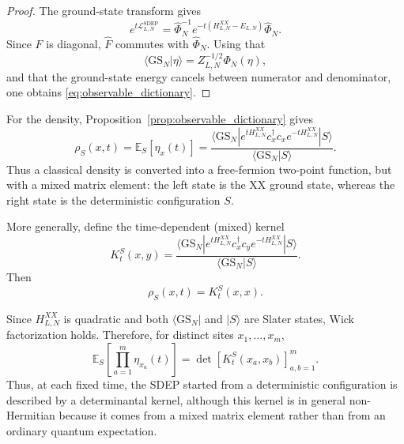 \documentclass[11pt]{article}
\numberwithin{equation}{section}
\newcommand{\1}{\mathbf 1}
\begin{document}
\begin{proof}
The ground-state transform gives
\[
    e^{t\mathcal L^{\mathrm{SDEP}}_{L,N}}
    =
    \widehat\Phi_N^{-1}
    e^{-t(H^{XX}_{L,N}-E_{L,N})}
    \widehat\Phi_N .
\]
Since \(F\) is diagonal, \(\widehat F\) commutes with \(\widehat\Phi_N\).  Using
that
\[
    \langle \mathrm{GS}_N|\eta\rangle
    =
    Z_{L,N}^{-1/2}\Phi_N(\eta),
\]
and that the ground-state energy cancels between numerator and denominator, one
obtains \eqref{eq:observable_dictionary}.
\end{proof}

For the density, Proposition~\ref{prop:observable_dictionary} gives
\begin{equation}
    \rho_S(x,t)
    =
    \mathbb E_S[\eta_x(t)]
    =
    \frac{
    \langle \mathrm{GS}_N|
    e^{tH^{XX}_{L,N}}
    c_x^\dagger c_x
    e^{-tH^{XX}_{L,N}}
    |S\rangle
    }{
    \langle \mathrm{GS}_N|S\rangle
    }.
    \label{eq:density_dictionary}
\end{equation}
Thus a classical density is converted into a free-fermion two-point function,
but with a mixed matrix element: the left state is the XX ground state, whereas
the right state is the deterministic configuration \(S\).

More generally, define the time-dependent (mixed) kernel
\begin{equation}
    K_t^S(x,y)
    =
    \frac{
    \langle \mathrm{GS}_N|
    e^{tH^{XX}_{L,N}}
    c_x^\dagger c_y
    e^{-tH^{XX}_{L,N}}
    |S\rangle
    }{
    \langle \mathrm{GS}_N|S\rangle
    }.
    \label{eq:time_dependent_mixed_kernel}
\end{equation}
Then
\[
    \rho_S(x,t)=K_t^S(x,x).
\]

Since \(H^{XX}_{L,N}\) is quadratic and both
\(\langle\mathrm{GS}_N|\) and \(|S\rangle\) are Slater states, Wick
factorization holds.  Therefore, for distinct sites
\(x_1,\ldots,x_m\),
\begin{equation}
    \mathbb E_S\left[
    \prod_{a=1}^m \eta_{x_a}(t)
    \right]
    =
    \det
    \left[
    K_t^S(x_a,x_b)
    \right]_{a,b=1}^m .
    \label{eq:determinantal_correlations}
\end{equation}
Thus, at each fixed time, the SDEP started from a deterministic configuration is
described by a determinantal kernel, although this kernel is in general
non-Hermitian because it comes from a mixed matrix element rather than from an
ordinary quantum expectation.
\end{document}
